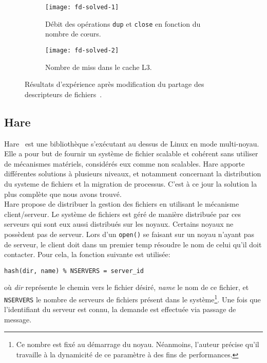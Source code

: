       \begin{figure}[ht]
        \begin{subfigure}[b]{0.5\textwidth}
          \texttt{[image: fd-solved-1]}
          \caption{Débit des opérations \texttt{dup} et \texttt{close} en
            fonction du nombre de c\oe urs.}
          \label{fig:fd-solved-1}
        \end{subfigure}
        \begin{subfigure}[b]{0.5\textwidth}
          \texttt{[image: fd-solved-2]}
          \caption{Nombre de miss dans le cache L3.}
          \label{fig:fd-solved-2}
        \end{subfigure}
        \caption{Résultats d'expérience après modification du partage des
          descripteurs de fichiers~\citep{boyd2008corey}.}
      \end{figure}
      \FloatBarrier



    \subsection{Hare}

      Hare~\citep{gruenwald2014providing} est une bibliothèque s'exécutant au
      dessus de Linux en mode multi-noyau. Elle a pour but de fournir un système
      de fichier scalable et cohérent sans utiliser de mécanismes matériels,
      considérés eux comme non scalables. Hare apporte différentes solutions à
      plusieurs niveaux, et notamment concernant la distribution du systeme de
      fichiers et la migration de processus. C'est à ce jour la solution la plus
      complète que nous avons trouvé.\\

      Hare propose de distribuer la gestion des fichiers en utilisant le
      mécanisme client/serveur. Le système de fichiers est géré de manière
      distribuée par ces serveurs qui sont eux aussi distribués sur les
      noyaux. Certains noyaux ne possèdent pas de serveur. Lors d'un
      \texttt{open()} se faisant sur un noyau n'ayant pas de serveur, le client
      doit dans un premier temp résoudre le nom de celui qu'il doit
      contacter. Pour cela, la fonction suivante est utilisée:
      \begin{center}
        \texttt{hash(dir, name) \% NSERVERS = server\_id}
      \end{center}
      où \textit{dir} représente le chemin vers le fichier désiré, \textit{name}
      le nom de ce fichier, et \texttt{NSERVERS} le nombre de serveurs de
      fichiers présent dans le système\footnote{Ce nombre est fixé au démarrage
        du noyau. Néanmoins, l'auteur précise qu'il travaille à la dynamicité de
        ce paramètre à des fins de performances.}. Une fois que l'identifiant du
      serveur est connu, la demande est effectuée via passage de message.

